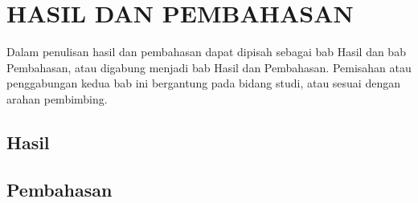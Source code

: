 
\chapter{HASIL DAN PEMBAHASAN}

Dalam penulisan hasil dan pembahasan dapat dipisah sebagai bab Hasil dan bab
Pembahasan, atau digabung menjadi bab Hasil dan Pembahasan.
Pemisahan atau penggabungan kedua bab ini bergantung pada bidang studi,
atau sesuai dengan arahan pembimbing.



\section{Hasil}

\section{Pembahasan}
